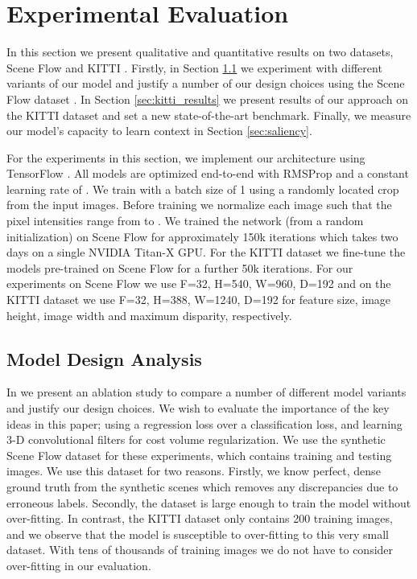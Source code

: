 \documentclass[10pt,twocolumn,letterpaper]{article}
\begin{document}
\section{Experimental Evaluation}
\label{section:evaluation}

In this section we present qualitative and quantitative results on two datasets, Scene Flow \cite{MIFDB16} and KITTI \cite{Geiger2012CVPR,Menze2015CVPR}. Firstly, in Section \ref{sec:model_results} we experiment with different variants of our model and justify a number of our design choices using the Scene Flow dataset \cite{MIFDB16}. In Section \ref{sec:kitti_results} we present results of our approach on the KITTI dataset and set a new state-of-the-art benchmark. Finally, we measure our model's capacity to learn context in Section \ref{sec:saliency}.

For the experiments in this section, we implement our architecture using TensorFlow \cite{tensorflow2015-whitepaper}. All models are optimized end-to-end with RMSProp \cite{tieleman2012lecture} and a constant learning rate of . We train with a batch size of 1 using a  randomly located crop from the input images. Before training we normalize each image such that the pixel intensities range from  to . We trained the network (from a random initialization) on Scene Flow for approximately 150k iterations which takes two days on a single NVIDIA Titan-X GPU. For the KITTI dataset we fine-tune the models pre-trained on Scene Flow for a further 50k iterations. For our experiments on Scene Flow we use F=32, H=540, W=960, D=192 and on the KITTI dataset we use F=32, H=388, W=1240, D=192 for feature size, image height, image width and maximum disparity, respectively.

\subsection{Model Design Analysis}
\label{sec:model_results}

In  we present an ablation study to compare a number of different model variants and justify our design choices. We wish to evaluate the importance of the key ideas in this paper; using a regression loss over a classification loss, and learning 3-D convolutional filters for cost volume regularization. We use the synthetic Scene Flow dataset \cite{MIFDB16} for these experiments, which contains  training and  testing images. We use this dataset for two reasons. Firstly, we know perfect, dense ground truth from the synthetic scenes which removes any discrepancies due to erroneous labels. Secondly, the dataset is large enough to train the model without over-fitting. In contrast, the KITTI dataset only contains 200 training images, and we observe that the model is susceptible to over-fitting to this very small dataset. With tens of thousands of training images we do not have to consider over-fitting in our evaluation.
\end{document}
